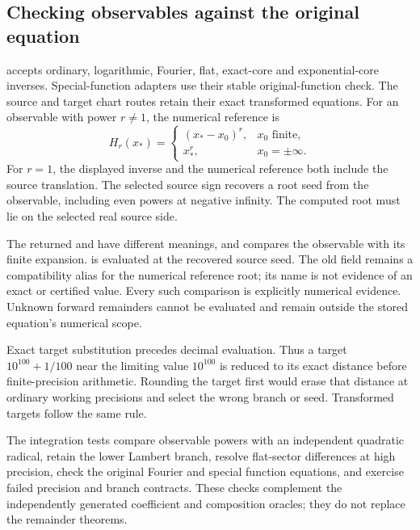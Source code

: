 \subsection{Checking observables against the original equation}

 accepts ordinary, logarithmic, Fourier, flat,
exact-core and exponential-core inverses. Special-function adapters use
their stable original-function check. The source and target chart routes
retain their exact transformed equations. For an observable with power
$r\ne1$, the numerical reference is
\[
 H_r(x_*)=\begin{cases}(x_*-x_0)^r,&x_0\text{ finite},\\
 x_*^r,&x_0=\pm\infty.
 \end{cases}
\]
For $r=1$, the displayed inverse and the numerical reference both include
the source translation. The selected source sign recovers a root seed
from the observable, including even powers at negative infinity. The
computed root must lie on the selected real source side.

The returned  and  have
different meanings, and  compares the observable with its
finite expansion.  is evaluated at the recovered
source seed. The old  field remains a compatibility
alias for the numerical reference root; its name is not evidence of an
exact or certified value. Every such comparison is explicitly numerical
evidence. Unknown forward remainders cannot be evaluated and remain
outside the stored equation's numerical scope.

Exact target substitution precedes decimal evaluation. Thus a target
$10^{100}+1/100$ near the limiting value $10^{100}$ is reduced to its exact
distance before finite-precision arithmetic. Rounding the target first
would erase that distance at ordinary working precisions and select the
wrong branch or seed. Transformed targets follow the same rule.

The integration tests compare observable powers with an independent
quadratic radical, retain the lower Lambert branch, resolve flat-sector
differences at high precision, check the original Fourier and special
function equations, and exercise failed precision and branch contracts.
These checks complement the independently generated coefficient and
composition oracles; they do not replace the remainder theorems.
